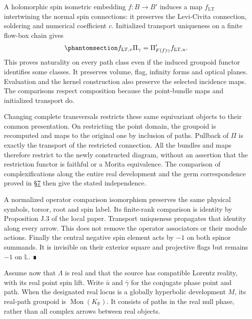 \documentclass[
  english,
  11pt,
  reqno]{amsart}
\begin{document}
A holomorphic spin isometric embedding \(f:B\to B'\) induces a map
\(f_{\mathrm{LT}}\) intertwining the normal spin connections: it
preserves the Levi-Civita connection, soldering and numerical
coefficient \(c\). Initialized transport uniqueness on a finite flow-box
chain gives
\begin{equation}\protect\phantomsection\label{eq:global-projective-transport-naturality}{
f_{\mathrm{LT},v}\Pi_\gamma
=\Pi'_{F(f)\gamma}f_{\mathrm{LT},u}.
}\end{equation} This proves naturality on every path class even if the
induced groupoid functor identifies some classes. It preserves volume,
flag, infinity forms and optical planes. Evaluation and the kernel
construction also preserve the selected incidence maps. The comparisons
respect composition because the point-bundle maps and initialized
transport do.

Changing complete transversals restricts these same equivariant objects
to their common presentation. On restricting the point domain, the
groupoid is recomputed and maps to the original one by inclusion of
paths. Pullback of \(\Pi\) is exactly the transport of the restricted
connection. All the bundles and maps therefore restrict to the newly
constructed diagram, without an assertion that the restriction functor
is faithful or a Morita equivalence. The comparison of complexifications
along the entire real development and the germ correspondence proved in
\hyperref[sec:germ-correspondence-v08]{§7} then give the stated
independence.

A normalized operator comparison isomorphism preserves the same physical
symbols, torsor, root and spin label. Its finite-rank comparison is
identity by Proposition J.3 of the local paper. Transport uniqueness
propagates that identity along every arrow. This does not remove the
operator associators or their module actions. Finally the central
negative spin element acts by \(-1\) on both spinor summands. It is
invisible on their exterior square and projective flags but remains
\(-1\) on \(\mathbb L\). ∎

Assume now that \(\Lambda\) is real and that the source has compatible
Lorentz reality, with its real point spin lift. Write \(\bar u\) and
\(\bar\gamma\) for the conjugate phase point and path. When the
designated real locus is a globally hyperbolic development \(M\), its
real-path groupoid is \(\operatorname{Mon}(K_{\mathbb R})\). It consists
of paths in the real null phase, rather than all complex arrows between
real objects.
\end{document}
